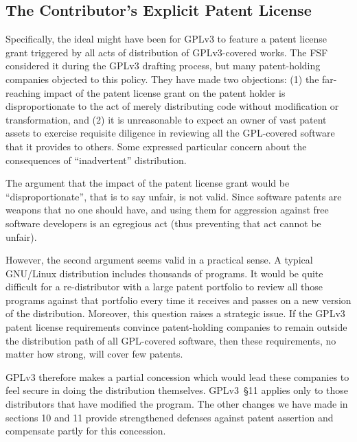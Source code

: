 \subsection{The Contributor's Explicit Patent License}

Specifically, the ideal might have been for GPLv3 to feature a patent license
grant triggered by all acts of distribution of GPLv3-covered works.  The FSF
considered it during the GPLv3 drafting process, but many patent-holding
companies objected to this policy.  They have made two objections: (1) the
far-reaching impact of the patent license grant on the patent holder is
disproportionate to the act of merely distributing code without modification
or transformation, and (2) it is unreasonable to expect an owner of vast
patent assets to exercise requisite diligence in reviewing all the
GPL-covered software that it provides to others.  Some expressed particular
concern about the consequences of ``inadvertent'' distribution.

The argument that the impact of the patent license grant would be
``disproportionate'',  that is to say unfair, is not valid. Since
software patents are weapons that no one should have, and using them for
aggression against free software developers is an egregious act (thus
preventing that act cannot be unfair). 

However, the second argument seems valid in a practical sense.  A
typical GNU/Linux distribution includes thousands of programs.  It would
be quite difficult for a re-distributor with a large patent portfolio to
review all those programs against that portfolio every time it receives
and passes on a new version of the distribution.  Moreover, this question
raises a strategic issue. If the GPLv3 patent license requirements
convince patent-holding companies to remain outside the distribution
path of all GPL-covered software, then these requirements, no matter how
strong, will cover few patents. 

GPLv3 therefore makes a partial concession
which would lead these companies to feel secure in doing the
distribution themselves. GPLv3~\S11
applies only to those distributors that have
modified the program.  The other changes we have made in sections 10 and
11 provide strengthened defenses against patent assertion and compensate
partly for this concession. 

